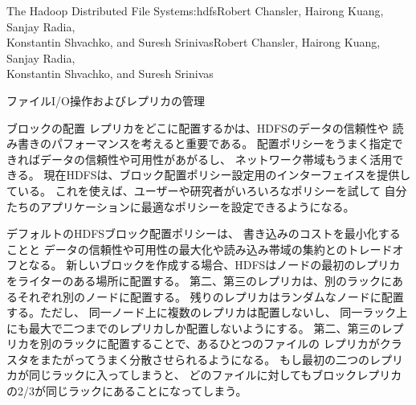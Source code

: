 \begin{aosachaptertoc}{The Hadoop Distributed File System}{s:hdfs}{Robert Chansler, Hairong Kuang, Sanjay Radia, \\ Konstantin Shvachko, and Suresh Srinivas}{Robert Chansler, Hairong Kuang, Sanjay Radia, \\ \hspace*{0.9cm} Konstantin Shvachko, and Suresh Srinivas}
\begin{aosasect1}{ファイルI/O操作およびレプリカの管理}
\begin{aosasect2}{ブロックの配置}
レプリカをどこに配置するかは、HDFSのデータの信頼性や
読み書きのパフォーマンスを考えると重要である。
配置ポリシーをうまく指定できればデータの信頼性や可用性があがるし、
ネットワーク帯域もうまく活用できる。
現在HDFSは、ブロック配置ポリシー設定用のインターフェイスを提供している。
これを使えば、ユーザーや研究者がいろいろなポリシーを試して
自分たちのアプリケーションに最適なポリシーを設定できるようになる。

デフォルトのHDFSブロック配置ポリシーは、
書き込みのコストを最小化することと
データの信頼性や可用性の最大化や読み込み帯域の集約とのトレードオフとなる。
新しいブロックを作成する場合、HDFSはノードの最初のレプリカをライターのある場所に配置する。
第二、第三のレプリカは、別のラックにあるそれぞれ別のノードに配置する。
残りのレプリカはランダムなノードに配置する。ただし、
同一ノード上に複数のレプリカは配置しないし、
同一ラック上にも最大で二つまでのレプリカしか配置しないようにする。
第二、第三のレプリカを別のラックに配置することで、あるひとつのファイルの
レプリカがクラスタをまたがってうまく分散させられるようになる。
もし最初の二つのレプリカが同じラックに入ってしまうと、
どのファイルに対してもブロックレプリカの2/3が同じラックにあることになってしまう。


\end{aosasect2}
\end{aosasect1}
\end{aosachaptertoc}
